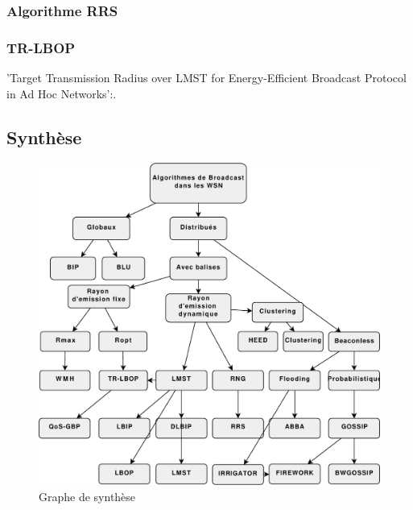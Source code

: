 \subsubsection{Algorithme RRS \cite{Cartigny2003RNG}}




\subsubsection{TR-LBOP}
'Target Transmission Radius over LMST for Energy-Efficient Broadcast Protocol in Ad Hoc Networks':\cite{Ingelrest2004}.\\








\subsection{Synthèse}

\begin{figure}[H]
\centering
\includegraphics[scale=0.8]{Etat_de_l'art/source/classification}
\caption{ Graphe de synthèse}
\end{figure} 



